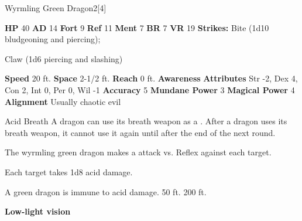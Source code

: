       
  \begin{monsubsection}{Wyrmling Green Dragon}{2}[4]
    \vspace{-1em}\vspace{-1em}
    \vspace{0em}

    
    

    \begin{spellcontent}
      \begin{spelltargetinginfo}
        \pari \textbf{HP} 40 \monsep
          \textbf{AD} 14 \monsep
          \textbf{Fort} 9 \monsep
          \textbf{Ref} 11 \monsep
          \textbf{Ment} 7
        \pari \textbf{BR} 7 \monsep
        \textbf{VR} 19
        \pari \textbf{Strikes:}
            Bite  (1d10 bludgeoning and piercing);
\par Claw  (1d6 piercing and slashing)
      \end{spelltargetinginfo}
    \end{spellcontent}
    \begin{monsterfooter}
      \pari \textbf{Speed} 20 ft. \monsep
        \textbf{Space} 2-1/2 ft. \monsep
        \textbf{Reach} 0 ft.
      \pari \textbf{Awareness} 
      \pari \textbf{Attributes}
        Str -2, Dex 4,
        Con 2, Int 0,
        Per 0, Wil -1
      \pari \textbf{Accuracy} 5 \monsep
        \textbf{Mundane Power} 3 \monsep
      \textbf{Magical Power} 4
      \pari \textbf{Alignment} Usually chaotic evil
    \end{monsterfooter}
  \end{monsubsection}
  \begin{freeability}{Acid Breath}
      A dragon can use its breath weapon as a .
      After a dragon uses its breath weapon, it cannot use it again until after the end of the next round.
      \par The wyrmling green dragon makes a  attack
        vs. Reflex against each target.
    
    \hit Each target takes 1d8 acid damage.
    \end{freeability}
  
      
       A green dragon is immune to acid damage.
     50 ft.
     200 ft.
    \par\noindent\textbf{Low-light vision}
  


